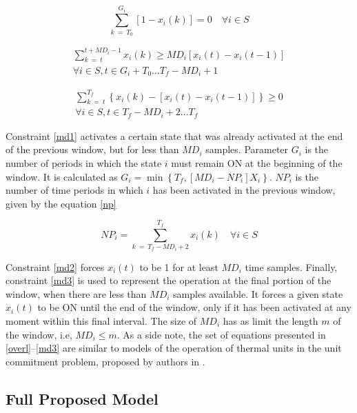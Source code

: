 \begin{equation}\label{md1}
    \sum_{k\ =\ T_0}^{G_i} \left[ 1 - x_i(k) \right] = 0 \quad \forall i \in S
\end{equation}

\begin{multline}\label{md2}
    \sum_{k\ =\ t}^{t+MD_i-1} x_i(k) \geq MD_i \left[ x_i(t) - x_i(t-1) \right] \\
    \forall i \in S, t \in G_i + T_0 \hdots T_f - {MD}_i + 1
\end{multline}

\begin{multline} \label{md3}
    \sum_{k\ =\ t}^{T_f} \left\{ x_i(k) - \left[ x_i(t) - x_i(t-1) \right] \right\} \geq 0 \\
    \forall i \in S, t \in T_f - MD_i + 2 \hdots T_f 
\end{multline}

Constraint \eqref{md1} activates a certain state that was already activated at the end of the previous window, but for less than $MD_i$ samples. Parameter $G_i$ is the number of periods in which the state $i$ must remain ON at the beginning of the window. It is calculated as $G_i = \min \left\{ T_f, \left[ MD_i - NP_i \right] X_i \right\}$. $NP_i$ is the number of time periods in which $i$ has been activated in the previous window, given by the equation \eqref{np}

\begin{equation} \label{np}
    NP_i = \sum_{k\ =\ T_f - MD_i + 2}^{T_f} { x_i(k) } \quad \forall i \in S
\end{equation}

Constraint \eqref{md2} forces $x_i(t)$ to be 1 for at least $MD_i$ time samples. Finally, constraint \eqref{md3} is used to represent the operation at the final portion of the window, when there are less than $MD_i$ samples available. It forces a given state $x_i(t)$ to be ON until the end of the window, only if it has been activated at any moment within this final interval. The size of $MD_i$ has as limit the length $m$ of the window, i.e, $MD_i \leq m$. 
As a side note, the set of equations presented in \eqref{overl}--\eqref{md3} are similar to models of the operation of thermal units in the unit commitment problem, proposed by authors in \cite{carrion2006}.

\subsection{Full Proposed Model}

